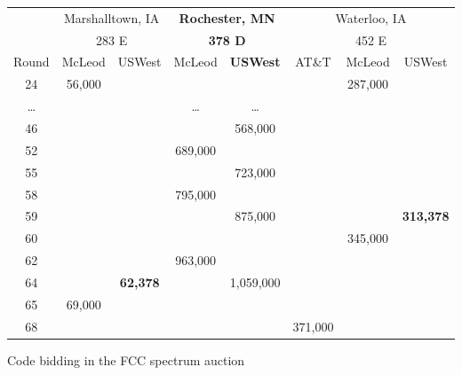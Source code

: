 \begin{figure}[t]
\begin{tabular}{|c|c|c|c|c|c|c|c|}
\hline
& \multicolumn{2}{|c|}{Marshalltown, IA} & \multicolumn{2}{|c|}{\textbf{Rochester, MN}} & \multicolumn{3}{|c|}{Waterloo, IA} \\
& \multicolumn{2}{|c|}{283 E} & \multicolumn{2}{|c|}{\textbf{378 D}} & \multicolumn{3}{|c|}{452 E} \\ \hline
{\small Round} & {\small McLeod} & {\small USWest} & {\small McLeod} & {\small \textbf{USWest}} & {\small AT\&T} & {\small McLeod} & {\small USWest} \\ \hline
24 & 56,000 & & & & & 287,000   & \\ \hline
\ldots & & & \ldots & \ldots & & & \\ \hline
46 & & & & {\small 568,000} & & & \\ \hline
52 & & & {\small 689,000} & & & & \\ \hline
55 & & & & {\small 723,000} & & & \\ \hline
58 & & & {\small 795,000} & & & & \\ \hline
59 & & & & {\small 875,000} & & & {\small \textbf{313,378}} \\ \hline
60 & & & & & & {\small 345,000} & \\ \hline
62 & & & {\small 963,000} & & & & \\ \hline
64 & & {\small \textbf{62,378}} & & {\small 1,059,000} & & & \\ \hline
65 & {\small 69,000} & & & & & & \\ \hline
68 & & & & & {\small 371,000} & & \\ \hline
\end{tabular}
\caption{Code bidding in the FCC spectrum auction}
\label{fig:codebidding}
\end{figure}



